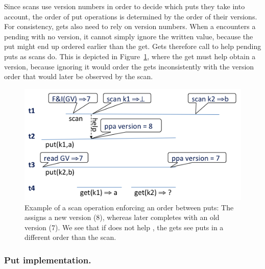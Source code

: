 Since scans use version numbers in order to decide which puts they take into account, the  order of put operations is determined by the order of their versions.
For consistency, gets also need to rely on version numbers.
When a   encounters a pending   with no version, it cannot simply ignore the written value, because the put might end up ordered earlier than the get.
Gets therefore call     to help pending puts as scans do.
This is depicted in Figure~\ref{fig:linearization}, where the get must help  obtain a version, because ignoring it
would order the gets inconsistently with the version order that would later be
observed by the scan.


\begin{figure}[tb]
\centerline{\includegraphics[width=0.6\columnwidth]{kiwi-linearization.png}}
\caption{Example of a scan operation enforcing an order between puts:
The  assigns
 a new version ($8$), whereas  later completes with an old version ($7$).
We see that if  does not help , the gets see puts in a  different order than the  scan.
}
\label{fig:linearization}
\end{figure}

\subsubsection{Put implementation.}


